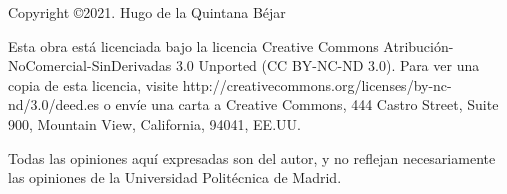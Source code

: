 \begin{flushleft}

Copyright \copyright  2021. Hugo de la Quintana Béjar


Esta obra está licenciada bajo la licencia Creative Commons Atribución-NoComercial-SinDerivadas 3.0 Unported (CC BY-NC-ND 3.0). Para ver una copia de esta licencia, visite http://creativecommons.org/licenses/by-nc-nd/3.0/deed.es o envíe una carta a Creative Commons, 444 Castro Street, Suite 900, Mountain View, California, 94041, EE.UU.

Todas las opiniones aquí expresadas son del autor, y no reflejan necesariamente las opiniones
de la Universidad Politécnica de Madrid.

\end{flushleft}